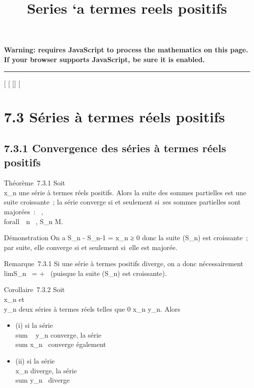 \documentclass[]{article}
\title{Series `a termes reels positifs}
\author{}
\date{}
\begin{document}
\maketitle

\textbf{Warning: 
requires JavaScript to process the mathematics on this page.\\ If your
browser supports JavaScript, be sure it is enabled.}

\begin{center}\rule{3in}{0.4pt}\end{center}

[
[
[]
[

\section{7.3 Séries à termes réels positifs}

\subsection{7.3.1 Convergence des séries à termes réels positifs}

Théorème~7.3.1 Soit \\\sum
 x_n une série à termes réels positifs. Alors la suite des
sommes partielles est une suite croissante~; la série converge si et
seulement si~ses sommes partielles sont majorées~:
\existsM \in {}~, \\forall~~n \in {}~,
S_n \leq M.

Démonstration On a S_n - S_n-1 = x_n ≥ 0 donc
la suite (S_n) est croissante~; par suite, elle converge si et
seulement si~elle est majorée.

Remarque~7.3.1 Si une série à termes positifs diverge, on a donc
nécessairement limS_n~ = +\infty~ (puisque
la suite (S_n) est croissante).

Corollaire~7.3.2 Soit \\\sum
 x_n et \\\sum
 y_n deux séries à termes réels telles que 0 \leq x_n
\leq y_n. Alors

\begin{itemize}
\itemsep1pt\parskip0pt
\item
  (i) si la série \\sum ~
  y_n converge, la série
  \\sum  x_n~
  converge également
\item
  (ii) si la série \\\sum
   x_n diverge, la série
  \\sum  y_n~
  diverge
\end{itemize}
\end{document}
